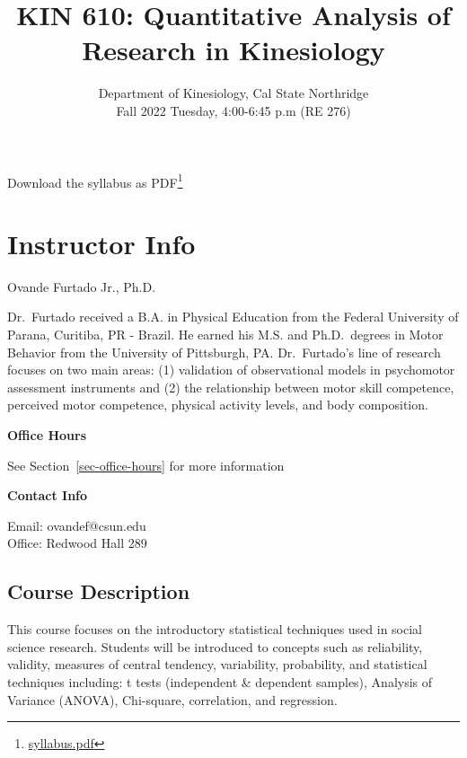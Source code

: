 \documentclass[
  letterpaper,
  DIV=11,
  numbers=noendperiod]{scrartcl}
\title{KIN 610: Quantitative Analysis of Research in Kinesiology}
\subtitle{Department of Kinesiology, Cal State Northridge\\
Fall 2022 \textbar{} Tuesday, 4:00-6:45 p.m (RE 276)}
\author{}
\date{}
\renewcommand*\contentsname{Table of contents}
\newcommand\contentsname{Table of contents}
\DeclareRobustCommand{\href}[2]{#2\footnote{\url{#1}}}
\begin{document}
\maketitle
\ifdefined\Shaded\renewenvironment{Shaded}{\begin{tcolorbox}[interior hidden, breakable, borderline west={3pt}{0pt}{shadecolor}, boxrule=0pt, frame hidden, enhanced, sharp corners]}{\end{tcolorbox}}\fi

\renewcommand*\contentsname{Table of contents}
{
\hypersetup{linkcolor=}
\setcounter{tocdepth}{3}
\tableofcontents
}
Download the syllabus as \href{syllabus.pdf}{PDF}

\hypertarget{sec-instructor-info}{%
\section{Instructor Info}\label{sec-instructor-info}}

Ovande Furtado Jr., Ph.D.

Dr.~Furtado received a B.A. in Physical Education from the Federal
University of Parana, Curitiba, PR - Brazil. He earned his M.S. and
Ph.D.~degrees in Motor Behavior from the University of Pittsburgh, PA.
Dr.~Furtado's line of research focuses on two main areas: (1) validation
of observational models in psychomotor assessment instruments and (2)
the relationship between motor skill competence, perceived motor
competence, physical activity levels, and body composition.

\textbf{Office Hours}

See Section~\ref{sec-office-hours} for more information

\textbf{Contact Info}

Email: ovandef@csun.edu\\
Office: Redwood Hall 289

\hypertarget{sec-course-description}{%
\subsection{Course Description}\label{sec-course-description}}

This course focuses on the introductory statistical techniques used in
social science research. Students will be introduced to concepts such as
reliability, validity, measures of central tendency, variability,
probability, and statistical techniques including: t tests (independent
\& dependent samples), Analysis of Variance (ANOVA), Chi-square,
correlation, and regression.
\end{document}
